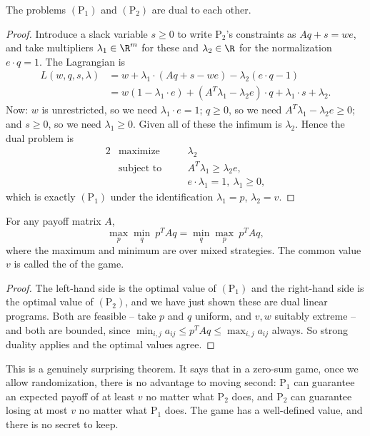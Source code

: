 \documentclass[a4paper]{scrartcl}
\begin{document}
\begin{theorem}
    The problems $(\mathrm{P}_1)$ and $(\mathrm{P}_2)$ are dual to each other.
\end{theorem}
\begin{proof}
    Introduce a slack variable $s \geq 0$ to write $\mathrm{P}_2$'s constraints as $Aq + s = we$, and take multipliers $\lambda_1 \in \R^m$ for these and $\lambda_2 \in \R$ for the normalization $e\cdot q = 1$. The Lagrangian is
    \begin{align*}
        L(w, q, s, \lambda) &= w + \lambda_1\cdot(Aq + s - we) - \lambda_2(e\cdot q - 1)\\
        &= w\left(1 - \lambda_1\cdot e\right) + \left(A^T\lambda_1 - \lambda_2 e\right)\cdot q + \lambda_1\cdot s + \lambda_2.
    \end{align*}
    Now: $w$ is unrestricted, so we need $\lambda_1\cdot e = 1$; $q \geq 0$, so we need $A^T\lambda_1 - \lambda_2 e \geq 0$; and $s \geq 0$, so we need $\lambda_1 \geq 0$. Given all of these the infimum is $\lambda_2$. Hence the dual problem is
    \begin{alignat*}{2}
        & \text{maximize} \quad && \lambda_2 \\
        & \text{subject to} \quad && A^T\lambda_1 \geq \lambda_2 e,\\
        & && e\cdot\lambda_1 = 1,\ \lambda_1 \geq 0,
    \end{alignat*}
    which is exactly $(\mathrm{P}_1)$ under the identification $\lambda_1 = p$, $\lambda_2 = v$.
\end{proof}

\begin{theorem}
    For any payoff matrix $A$,
    $$
    \max_{p}\min_{q}\ p^TAq = \min_{q}\max_{p}\ p^TAq,
    $$
    where the maximum and minimum are over mixed strategies. The common value $v$ is called the  of the game.
\end{theorem}
\begin{proof}
    The left-hand side is the optimal value of $(\mathrm{P}_1)$ and the right-hand side is the optimal value of $(\mathrm{P}_2)$, and we have just shown these are dual linear programs. Both are feasible -- take $p$ and $q$ uniform, and $v, w$ suitably extreme -- and both are bounded, since $\min_{i,j}a_{ij} \leq p^TAq \leq \max_{i,j}a_{ij}$ always. So strong duality applies and the optimal values agree.
\end{proof}

This is a genuinely surprising theorem. It says that in a zero-sum game, once we allow randomization, there is no advantage to moving second: $\mathrm{P}_1$ can guarantee an expected payoff of at least $v$ no matter what $\mathrm{P}_2$ does, and $\mathrm{P}_2$ can guarantee losing at most $v$ no matter what $\mathrm{P}_1$ does. The game has a well-defined value, and there is no secret to keep.
\end{document}
